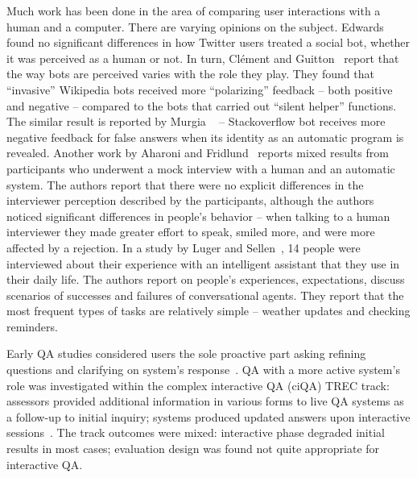 Much work has been done in the area of comparing user interactions with a human and a computer.
There are varying opinions on the subject.
Edwards \etal~\cite{edwards2014bot} found no significant differences in how Twitter users treated a social bot, whether it was perceived as a human or not.
In turn, Cl{\'e}ment and Guitton~\cite{clement2015interacting} report that the way bots are perceived varies with the role they play.
They found that ``invasive'' Wikipedia bots received more ``polarizing'' feedback -- both positive and negative -- compared to the bots that carried out ``silent helper'' functions.
The similar result is reported by Murgia \etal~\cite{murgia2016among} -- Stackoverflow bot receives more negative feedback for false answers when its identity as an automatic program is revealed. 
Another work by Aharoni and Fridlund~\cite{aharoni2007social} reports mixed results from participants who underwent a mock interview with a human and an automatic system.
The authors report that there were no explicit differences in the interviewer perception described by the participants, although the authors noticed significant differences in people's behavior -- when talking to a human interviewer they made greater effort to speak, smiled more, and were more affected by a rejection.
In a study by Luger and Sellen~\cite{luger2016chi}, 14 people were interviewed about their experience with an intelligent assistant that they use in their daily life. The authors report on people's experiences, expectations, discuss scenarios of successes and failures of conversational agents.
They report that the most frequent types of tasks are relatively simple -- weather updates and checking reminders.

Early QA studies considered users the sole proactive part asking refining questions and clarifying on system's response~\cite{deboni2005}.
QA with a more active system's role was investigated within the complex interactive QA (ciQA) TREC track: assessors provided additional information in various forms to live QA systems as a follow-up to initial inquiry; systems produced updated answers upon interactive sessions~\cite{dang2007overview}.
The track outcomes were mixed: interactive phase degraded initial results in most cases; evaluation design was found not quite appropriate for interactive QA.

